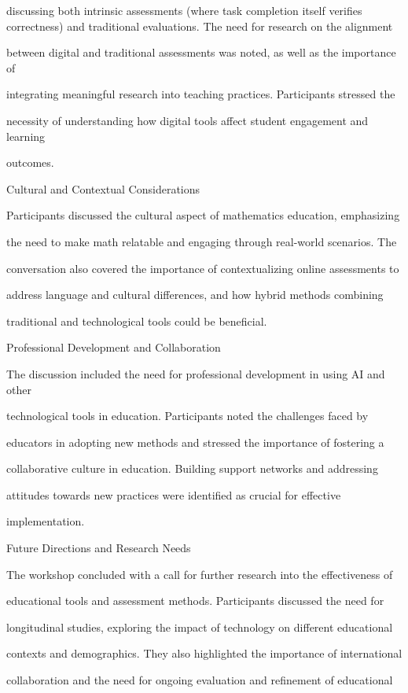 \documentclass[11pt]{article}
\begin{document}
discussing both intrinsic assessments (where task completion itself verifies correctness) and traditional evaluations. The need for research on the alignment

between digital and traditional assessments was noted, as well as the importance of

integrating meaningful research into teaching practices. Participants stressed the

necessity of understanding how digital tools affect student engagement and learning

outcomes.

Cultural and Contextual Considerations

Participants discussed the cultural aspect of mathematics education, emphasizing

the need to make math relatable and engaging through real-world scenarios. The

conversation also covered the importance of contextualizing online assessments to

address language and cultural differences, and how hybrid methods combining

traditional and technological tools could be beneficial.

Professional Development and Collaboration

The discussion included the need for professional development in using AI and other

technological tools in education. Participants noted the challenges faced by

educators in adopting new methods and stressed the importance of fostering a

collaborative culture in education. Building support networks and addressing

attitudes towards new practices were identified as crucial for effective

implementation.

Future Directions and Research Needs

The workshop concluded with a call for further research into the effectiveness of

educational tools and assessment methods. Participants discussed the need for

longitudinal studies, exploring the impact of technology on different educational

contexts and demographics. They also highlighted the importance of international

collaboration and the need for ongoing evaluation and refinement of educational
\end{document}
